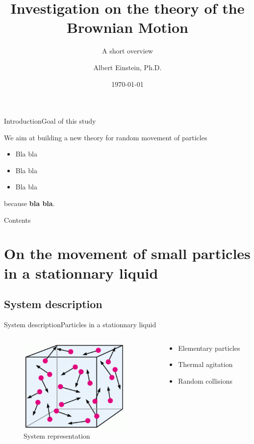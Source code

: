 \documentclass[10pt, compress]{beamer}
\title{Investigation on the theory of the Brownian Motion}
\subtitle{A short overview}
\date{\today}
\author{Albert Einstein, Ph.D.}
\institute{Swiss Federal Institute of Technology in Zurich}
\begin{document}
\maketitle

\begin{frame}{Introduction}{Goal of this study}
\begin{block}{}
\vspace{-0.2cm}
We aim at building a new theory for \textcolor{solarizedYellow}{random movement} of particles
\begin{itemize}
\item Bla bla
\item Bla bla
\item Bla bla
\end{itemize}
because \textbf{bla bla}.
\end{block}
\end{frame}

\begin{frame}{Contents}
\tableofcontents
\end{frame}

\section{On the movement of small particles in a stationnary liquid}

\subsection{System description}

\begin{frame}{System description}{Particles in a stationnary liquid}
\begin{columns}
\begin{column}{0.5\textwidth}
\begin{figure}
\hspace*{-0.75 cm}
\includegraphics[width=5.5cm]{particles.png}
\caption{System representation}
\end{figure}
\end{column}

\begin{column}{0.5\textwidth}
\begin{itemize}
    \item Elementary particles
    \item Thermal agitation
    \item Random collisions
\end{itemize}
\end{column}

\end{columns}
\end{frame}
\end{document}

